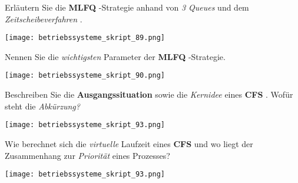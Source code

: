 \documentclass{article}
\begin{document}
\begin{tcolorbox}[colback=white!10!white,colframe=lightgray!75!black,
  savelowerto=\jobname_ex.tex,breakable,enhanced,lines before break=40]

\begin{center}
Erläutern Sie die 
\textbf{MLFQ
}-Strategie anhand von 
\textit{3 Queues
} und dem 
\textit{Zeitscheibeverfahren
}.

\end{center}

\tcblower

\justifying
\texttt{[image: betriebssysteme\_skript\_89.png]}

\end{tcolorbox}
\begin{tcolorbox}[colback=white!10!white,colframe=lightgray!75!black,
  savelowerto=\jobname_ex.tex,breakable,enhanced,lines before break=40]

\begin{center}
Nennen Sie die 
\textit{wichtigsten
} Parameter der 
\textbf{MLFQ
}-Strategie.

\end{center}

\tcblower

\justifying
\texttt{[image: betriebssysteme\_skript\_90.png]}

\end{tcolorbox}
\begin{tcolorbox}[colback=white!10!white,colframe=lightgray!75!black,
  savelowerto=\jobname_ex.tex,breakable,enhanced,lines before break=40]

\begin{center}
Beschreiben Sie die 
\textbf{Ausgangssituation
} sowie die 
\textit{Kernidee
} eines 
\textbf{CFS
}. Wofür steht die 
\textit{Abkürzung?
}
\end{center}

\tcblower

\justifying
\texttt{[image: betriebssysteme\_skript\_93.png]}

\end{tcolorbox}
\begin{tcolorbox}[colback=white!10!white,colframe=lightgray!75!black,
  savelowerto=\jobname_ex.tex,breakable,enhanced,lines before break=40]

\begin{center}
Wie berechnet sich die 
\textit{virtuelle
} Laufzeit eines 
\textbf{CFS
} und wo liegt der Zusammenhang zur 
\textit{Priorität
} eines Prozesses?

\end{center}

\tcblower

\justifying
\texttt{[image: betriebssysteme\_skript\_93.png]}

\end{tcolorbox}
\end{document}
